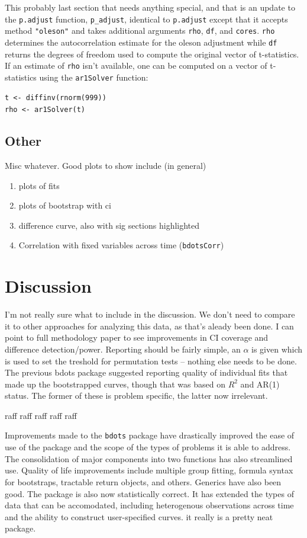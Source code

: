\documentclass{article}
\begin{document}
This probably last section that needs anything special, and that is an update to the \texttt{p.adjust} function, \texttt{p\_adjust}, identical to \texttt{p.adjust} except that it accepts method \texttt{"oleson"} and takes additional arguments \texttt{rho}, \texttt{df}, and \texttt{cores}. \texttt{rho} determines the autocorrelation estimate for the oleson adjustment while \texttt{df} returns the degrees of freedom used to compute the original vector of t-statistics. If an estimate of \texttt{rho} isn't available, one can be computed on a vector of t-statistics using the \texttt{ar1Solver} function:

\begin{center}
\texttt{t <- diffinv(rnorm(999))} \\
\texttt{rho <- ar1Solver(t)}
\end{center}


\subsection{Other}

Misc whatever. Good plots to show include (in general)

\begin{enumerate}
\item plots of fits
\item plots of bootstrap with ci
\item difference curve, also with sig sections highlighted
\item Correlation with fixed variables across time (\texttt{bdotsCorr})
\end{enumerate}

\section{Discussion}
I'm not really sure what to include in the discussion. We don't need to compare it to other approaches for analyzing this data, as that's aleady been done. I can point to full methodology paper to see improvements in CI coverage and difference detection/power. Reporting should be fairly simple, an $\alpha$ is given which is used to set the treshold for permutation tests -- nothing else needs to be done. The previous bdots package suggested reporting quality of individual fits that made up the bootstrapped curves, though that was based on $R^2$ and AR(1) status. The former of these is problem specific, the latter now irrelevant.

raff raff raff raff raff


Improvements made to the \texttt{bdots} package have drastically improved the ease of use of the package and the scope of the types of  problems it is able to address. The consolidation of major components into two functions has also streamlined use. Quality of life improvements include multiple group fitting, formula syntax for bootstraps, tractable return objects, and others. Generics have also been good. The package is also now statistically correct. It has extended the types of data that can be accomodated, including heterogenous observations across time and the ability to construct user-specified curves. it really is a pretty neat package.
\end{document}

